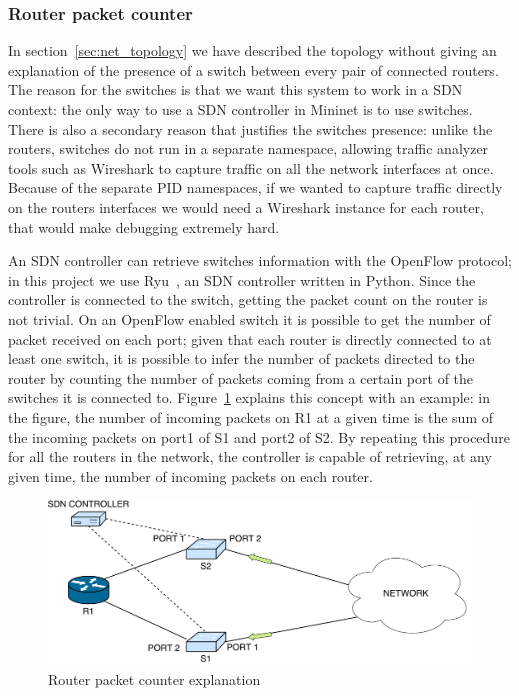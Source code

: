 \subsubsection{Router packet counter}
\label{sec:packet_counter}
In section~\ref{sec:net_topology} we have described the topology without giving an explanation of the presence of a switch between every pair of connected routers. The reason for the switches is that we want this system to work in a SDN context: the only way to use a SDN controller in Mininet is to use switches. There is also a secondary reason that justifies the switches presence: unlike the routers, switches do not run in a separate namespace, allowing traffic analyzer tools such as Wireshark to capture traffic on all the network interfaces at once. Because of the separate PID namespaces, if we wanted to capture traffic directly on the routers interfaces we would need a Wireshark instance for each router, that would make debugging extremely hard. 

An SDN controller can retrieve switches information with the OpenFlow protocol; in this project we use Ryu~\cite{ryu}, an SDN controller written in Python. Since the controller is connected to the switch, getting the packet count on the router is not trivial. On an OpenFlow enabled switch it is possible to get the number of packet received on each port; given that each router is directly connected to at least one switch, it is possible to infer the number of packets directed to the router by counting the number of packets coming from a certain port of the switches it is connected to. Figure~\ref{fig:packet_counter} explains this concept with an example: in the figure, the number of incoming packets on R1 at a given time is the sum of the incoming packets on port1 of S1 and port2 of S2. By repeating this procedure for all the routers in the network, the controller is capable of retrieving, at any given time, the number of incoming packets on each router.
\begin{figure}[h]
\centering
\includegraphics[width=\textwidth]{img/packet_counter}
\caption{Router packet counter explanation}
\label{fig:packet_counter}
\end{figure}


